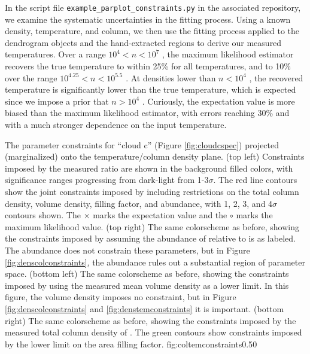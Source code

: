 In the script file \texttt{example\_parplot\_constraints.py} in the associated
repository, we examine the systematic uncertainties in the fitting process.
Using a known density, temperature, and column, we then use the fitting process
applied to the dendrogram objects and the hand-extracted regions to derive our
measured temperatures.  Over a range $10^4 < n < 10^7$ \percc, the maximum
likelihood estimator recovers the true temperature to within 25\% for all
temperatures, and to 10\% over the range $10^{4.25} < n < 10^5.5$ \percc.  At
densities lower than $n<10^4$ \percc, the recovered temperature is
significantly lower than the true temperature, which is expected since we
impose a prior that $n>10^4$ \percc.  Curiously, the expectation value is more
biased than the maximum likelihood estimator, with errors reaching 30\% and
with a much stronger dependence on the input temperature.

{The parameter constraints for ``cloud c'' (Figure \ref{fig:cloudcspec})
projected (marginalized) onto the temperature/column density plane.\newline
(top left) Constraints imposed by the measured ratio \Rone are shown in the
background filled colors,
with significance ranges progressing from dark-light from 1-3$\sigma$.  The
red line contours show the joint constraints imposed by including
restrictions on the
total column density, volume density,  filling factor, and abundance, with
1, 2, 3, and 4$\sigma$ contours shown.
The $\times$ marks the expectation value and the $\circ$ marks the maximum
likelihood value.
\newline
(top right) The same colorscheme as before, showing the constraints imposed by
assuming the abundance of \para relative to \hh is as labeled.  
The abundance does not constrain these parameters, but in Figure
\ref{fig:denscolconstraints}, the abundance rules out a substantial region of parameter
space.
\newline
(bottom left) The same colorscheme as before, showing the constraints imposed
by using the measured mean volume density as a lower limit.  In this figure,
the volume density imposes no constraint, but in Figure \ref{fig:denscolconstraints}
and \ref{fig:denstemconstraints} it is important.
\newline
(bottom right) The same colorscheme as before, showing the constraints imposed
by the measured total column density of \hh.  The green contours show
constraints imposed by the lower limit on the area filling factor.}
{fig:coltemconstraints}{0.5}{0}

